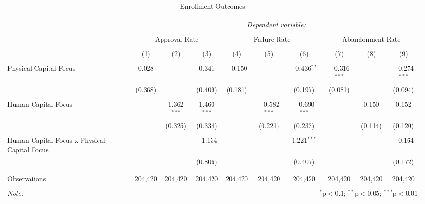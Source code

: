 
\begin{table}[!htbp] \centering 
  \caption{Enrollment Outcomes} 
  \label{} 
\begin{tabular}{@{\extracolsep{5pt}}lccccccccc} 
\\[-1.8ex]\hline 
\hline \\[-1.8ex] 
 & \multicolumn{9}{c}{\textit{Dependent variable:}} \\ 
\cline{2-10} 
\\[-1.8ex] & \multicolumn{3}{c}{Approval Rate} & \multicolumn{3}{c}{Failure Rate} & \multicolumn{3}{c}{Abandonment Rate} \\ 
\\[-1.8ex] & (1) & (2) & (3) & (4) & (5) & (6) & (7) & (8) & (9)\\ 
\hline \\[-1.8ex] 
 Physical Capital Focus & 0.028 &  & 0.341 & $-$0.150 &  & $-$0.436$^{**}$ & $-$0.316$^{***}$ &  & $-$0.274$^{***}$ \\ 
  & (0.368) &  & (0.409) & (0.181) &  & (0.197) & (0.081) &  & (0.094) \\ 
  & & & & & & & & & \\ 
 Human Capital Focus &  & 1.362$^{***}$ & 1.460$^{***}$ &  & $-$0.582$^{***}$ & $-$0.690$^{***}$ &  & 0.150 & 0.152 \\ 
  &  & (0.325) & (0.334) &  & (0.221) & (0.233) &  & (0.114) & (0.120) \\ 
  & & & & & & & & & \\ 
 Human Capital Focus x Physical Capital Focus &  &  & $-$1.134 &  &  & 1.221$^{***}$ &  &  & $-$0.164 \\ 
  &  &  & (0.806) &  &  & (0.407) &  &  & (0.172) \\ 
  & & & & & & & & & \\ 
\hline \\[-1.8ex] 
Observations & 204,420 & 204,420 & 204,420 & 204,420 & 204,420 & 204,420 & 204,420 & 204,420 & 204,420 \\ 
\hline 
\hline \\[-1.8ex] 
\textit{Note:}  & \multicolumn{9}{r}{$^{*}$p$<$0.1; $^{**}$p$<$0.05; $^{***}$p$<$0.01} \\ 
\end{tabular} 
\end{table} 
